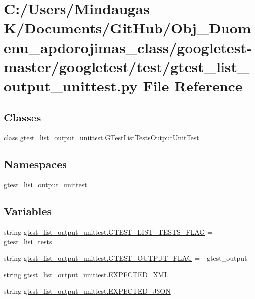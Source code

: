 \hypertarget{googletest-master_2googletest_2test_2gtest__list__output__unittest_8py}{}\section{C\+:/\+Users/\+Mindaugas K/\+Documents/\+Git\+Hub/\+Obj\+\_\+\+Duomenu\+\_\+apdorojimas\+\_\+class/googletest-\/master/googletest/test/gtest\+\_\+list\+\_\+output\+\_\+unittest.py File Reference}
\label{googletest-master_2googletest_2test_2gtest__list__output__unittest_8py}
\subsection*{Classes}
\begin{DoxyCompactItemize}
\item 
class \mbox{\hyperlink{classgtest__list__output__unittest_1_1_g_test_list_tests_output_unit_test}{gtest\+\_\+list\+\_\+output\+\_\+unittest.\+G\+Test\+List\+Tests\+Output\+Unit\+Test}}
\end{DoxyCompactItemize}
\subsection*{Namespaces}
\begin{DoxyCompactItemize}
\item 
 \mbox{\hyperlink{namespacegtest__list__output__unittest}{gtest\+\_\+list\+\_\+output\+\_\+unittest}}
\end{DoxyCompactItemize}
\subsection*{Variables}
\begin{DoxyCompactItemize}
\item 
string \mbox{\hyperlink{namespacegtest__list__output__unittest_a37b4604332427bf1e439809e5b116cb5}{gtest\+\_\+list\+\_\+output\+\_\+unittest.\+G\+T\+E\+S\+T\+\_\+\+L\+I\+S\+T\+\_\+\+T\+E\+S\+T\+S\+\_\+\+F\+L\+AG}} = \textquotesingle{}-\/-\/gtest\+\_\+list\+\_\+tests\textquotesingle{}
\item 
string \mbox{\hyperlink{namespacegtest__list__output__unittest_a3124ac294a9b2dd4fc504bf7d98b39a0}{gtest\+\_\+list\+\_\+output\+\_\+unittest.\+G\+T\+E\+S\+T\+\_\+\+O\+U\+T\+P\+U\+T\+\_\+\+F\+L\+AG}} = \textquotesingle{}-\/-\/gtest\+\_\+output\textquotesingle{}
\item 
string \mbox{\hyperlink{namespacegtest__list__output__unittest_a8e3429fbd5f2ccb15d77af07b212c355}{gtest\+\_\+list\+\_\+output\+\_\+unittest.\+E\+X\+P\+E\+C\+T\+E\+D\+\_\+\+X\+ML}}
\item 
string \mbox{\hyperlink{namespacegtest__list__output__unittest_ab23ce49d040a6881e33eec438c566c88}{gtest\+\_\+list\+\_\+output\+\_\+unittest.\+E\+X\+P\+E\+C\+T\+E\+D\+\_\+\+J\+S\+ON}}
\end{DoxyCompactItemize}
